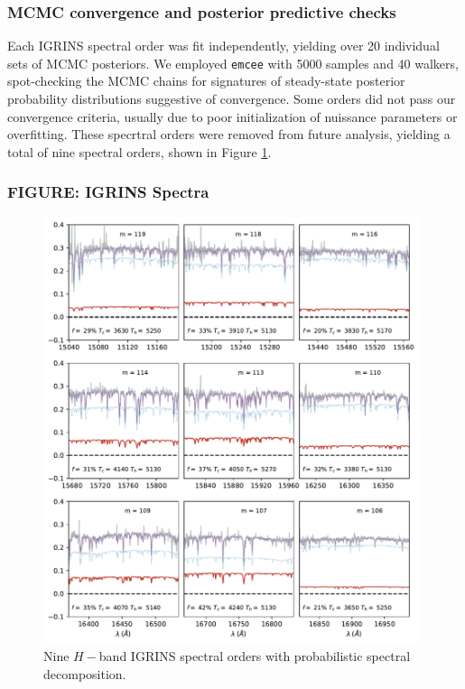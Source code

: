 \documentclass[twocolumn]{emulateapj}%
\begin{document}
\begin{itemize}
\subsubsection{MCMC convergence and posterior predictive checks}
Each IGRINS spectral order was fit independently, yielding over 20 individual sets of MCMC posteriors.  We employed \texttt{emcee} \citep{foreman13} with 5000 samples and 40 walkers, spot-checking the MCMC chains for signatures of steady-state posterior probability distributions suggestive of convergence.  Some orders did not pass our convergence criteria, usually due to poor initialization of nuissance parameters or overfitting.  These specrtral orders were removed from future analysis, yielding a total of nine spectral orders, shown in Figure \ref{fig:IGRINS_spectra3x3}.

\subsubsection{FIGURE: IGRINS Spectra}
\begin{figure}
 \centering
 \includegraphics[width=0.98\textwidth]{figures/H_band_spectra_3x3.pdf}
 \caption{Nine $H-$band IGRINS spectral orders with probabilistic spectral decomposition.}
 \label{fig:IGRINS_spectra3x3}
\end{figure}


\end{itemize}
\end{document}

